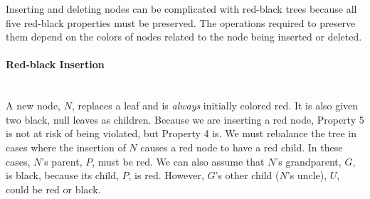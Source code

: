 Inserting and deleting nodes can be complicated with red-black trees because all five red-black properties must be preserved. The operations required to preserve them depend on the colors of nodes related to the node being inserted or deleted.

\paragraph{Red-black Insertion} \hspace*{1mm} \vspace*{2mm} \\
A new node, $N$, replaces a leaf and is \textit{always} initially colored red. It is also given two black, null leaves as children. Because we are inserting a red node, Property 5 is not at risk of being violated, but Property 4 is. We must rebalance the tree in cases where the insertion of $N$ causes a red node to have a red child. In these cases, $N$'s parent, $P$, must be red. We can also assume that $N$'s grandparent, $G$, is black, because its child, $P$, is red. However, $G$'s other child ($N$'s uncle), $U$, could be red or black. \\

